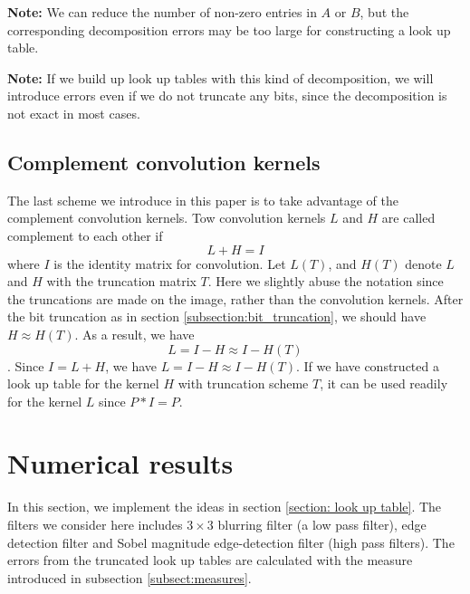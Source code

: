 \documentclass[12pt]{amsart}
\theoremstyle{definition}
\theoremstyle{remark}
\numberwithin{thm}{section}
\begin{document}
\textbf{Note:} We can reduce the number of non-zero entries in $A$ or $B$, but the corresponding decomposition errors may be too large for constructing a look up table. 

\textbf{Note:} If we build up look up tables with this kind of decomposition, we will introduce errors even if we do not truncate any bits, since the decomposition is not exact in most cases.

\subsection{Complement convolution kernels}
The last scheme we introduce in this paper is to take advantage of the complement convolution kernels. Tow convolution kernels $L$ and $H$ are called complement to each other if 
$$L+H=I$$
where $I$ is the identity matrix for convolution. Let $L(T)$, and $H(T)$ denote $L$ and $H$ with the truncation matrix $T$. Here we slightly abuse the notation since the truncations are made on the image, rather than the convolution kernels. After the bit truncation as in section \ref{subsection:bit_truncation}, we should have $H\approx H(T)$. As a result, we have 
$$L = I - H \approx I - H(T)$$.
Since $I = L + H$, we have $L = I - H \approx I - H(T)$. If we have constructed a look up table for the kernel $H$ with truncation scheme $T$, it can be used readily for the kernel $L$ since $P*I=P$. 

\section{Numerical results}\label{section: numerical results}
In this section, we implement the ideas in section \ref{section: look up table}. The filters we consider here includes $3\times 3$ blurring filter (a low pass filter), edge detection filter and Sobel magnitude edge-detection filter (high pass filters). The errors from the truncated look up tables are calculated with the measure introduced in subsection \ref{subsect:measures}. 
\end{document}
